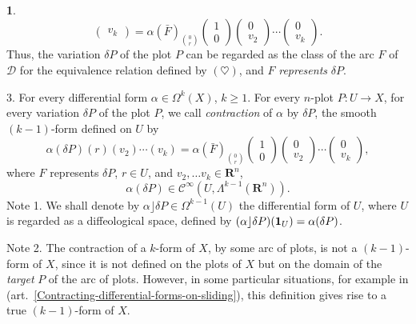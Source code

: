 \documentclass[11pt,reqno]{amsart}
\theoremstyle{definition}
\newtheorem{article}{}
\newcommand{\RR}{{\mathbf R}}
\def \F{{F}}
\def \P{{P}}
\def \U{{U}}
\def \X{{X}}
\newcommand{\cC}{{\mathcal C}}
\newcommand{\cD}{{\mathcal D}}
\newcommand{\art}[1]{{(art.~\ref{#1})}}
\newcommand{\Form}{\mbox{$\Lambda$}}
\newcommand{\Cinf}{{\cC}^\infty}
\newcommand{\id}{{\bf 1}}
\begin{document}
\begin{article}
\begin{equation}
\begin{pmatrix}
        v_{k}\end{pmatrix} = \alpha(\bar \F)_{0 \choose
      r} \begin{pmatrix}1 \\ 0\end{pmatrix} \begin{pmatrix}0 \\ v_2\end{pmatrix} \cdots 
      \begin{pmatrix}0 \\ v_{k}\end{pmatrix}.
    \end{equation}
    Thus, the variation $\delta \P$ of the plot $\P$ can
    be regarded as the class of the arc $\F$ of $\cD$ for the
    equivalence relation defined by $(\heartsuit)$, and $\F$
    {\em represents} $\delta\P$.
    
    3. For every differential form $\alpha \in
      \Omega^k(\X)$, $k \geq 1$. For every $n$-plot $\P :
        \U \to \X$, for every variation $\delta\P$ of the plot
    $\P$, we call {\em contraction} of $\alpha$ by 
    $\delta \P$, the smooth $(k-1)$-form defined on $\U$ by
    \begin{equation}
      \renewcommand{\theequation}{$\diamondsuit$}
      \alpha(\delta
      \P)(r)(v_2)\cdots(v_{k}) =  \alpha(\bar
      \F)_{0 \choose r}\begin{pmatrix}1 \\ 0\end{pmatrix} \begin{pmatrix}0 \\ v_2\end{pmatrix}
      \cdots\begin{pmatrix}0 \\ v_{k}\end{pmatrix},
    \end{equation}
    where $\F$ represents $\delta \P$, $r \in \U$,
    and $v_2,\ldots v_{k} \in \RR^n$,
    $$
      \alpha(\delta \P) \in \Cinf(\U, \Form^{k-1}(\RR^n)).
      $$
    {\sc Note 1.} We shall denote by $\alpha \rfloor \delta
      \P \in \Omega^{k-1}(\U)$ the differential form of $\U$,
    where $\U$ is regarded as a diffeological space, defined
    by $(\alpha \rfloor \delta \P)(\id_\U) = \alpha(\delta
      \P)$.
    
    {\sc Note 2.} The contraction of
    a $k$-form of $\X$, by some arc of plots, is not a
    $(k-1)$-form of $\X$, since it is not defined on the
    plots of $\X$ but on the domain of the {\em target} $\P$
    of the arc of plots. However, in some particular
    situations, for example in
    \art{Contracting-differential-forms-on-sliding}, this
    definition gives rise to a true $(k-1)$-form of $\X$.
    

\end{article}
\end{document}
